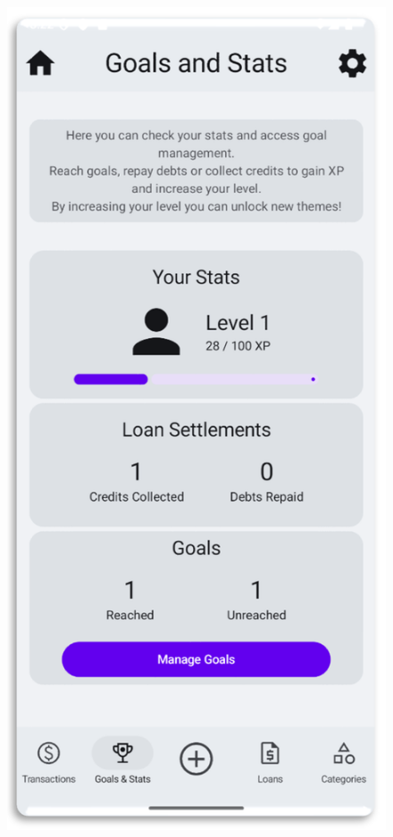 \documentclass[a4paper,12pt]{article}
\begin{document}
\begin{figure}[H]
    \centering
    \includegraphics[scale=0.6]{G&T.png}
\end{figure}
\end{document}

